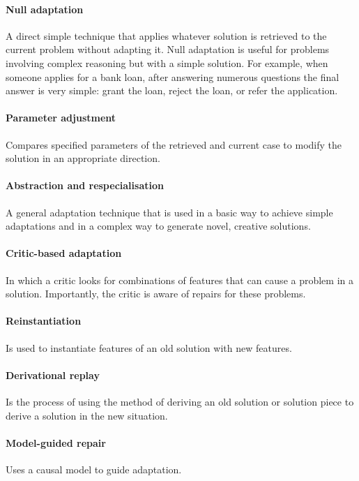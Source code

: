 \paragraph{Null adaptation} A direct simple technique that applies whatever solution is retrieved to the current 
problem without adapting it. Null adaptation is useful for problems involving complex 
reasoning but with a simple solution. For example, when someone applies for a bank loan, 
after answering numerous questions the final answer is very simple: grant the loan, 
reject the loan, or refer the application.

\paragraph{Parameter adjustment} Compares specified parameters of the retrieved 
and current case to modify the solution in an appropriate direction.

\paragraph{Abstraction and respecialisation}
A general adaptation technique that is used in a basic way to achieve simple 
adaptations and in a complex way to generate novel, creative solutions.

\paragraph{Critic-based adaptation}
In which a critic looks for combinations of features that can cause a problem in 
a solution. Importantly, the critic is aware of repairs for these problems.

\paragraph{Reinstantiation}
Is used to instantiate features of an old solution with new features.

\paragraph{Derivational replay}
Is the process of using the method of deriving an old solution or solution piece to derive a solution in the new situation.

\paragraph{Model-guided repair}
Uses a causal model to guide adaptation.

